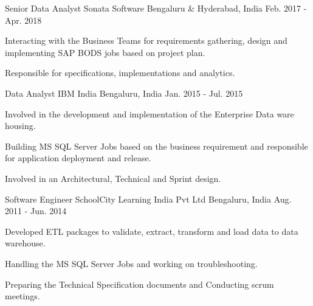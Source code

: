 \begin{cventries}

\cventry
{Senior Data Analyst} %
{Sonata Software} %
{Bengaluru \& Hyderabad, India} %
{Feb. 2017 - Apr. 2018} %
{ %
\begin{cvitems}
\item {Interacting with the Business Teams for requirements gathering, design and implementing SAP BODS jobs based on project plan.}
\item {Responsible for specifications, implementations and analytics.}
\end{cvitems}
}


\cventry
{Data Analyst} %
{IBM India} %
{Bengaluru, India} %
{Jan. 2015 - Jul. 2015} %
{ %
\begin{cvitems}
\item {Involved in the development and implementation of the Enterprise Data ware housing.}
\item {Building MS SQL Server Jobs based on the business requirement and responsible for application deployment and release.}
\item {Involved in an Architectural, Technical and Sprint design.}
\end{cvitems} 
}


\cventry
{Software Engineer} %
{SchoolCity Learning India Pvt Ltd} %
{Bengaluru, India} %
{Aug. 2011 - Jun. 2014} %
{ %
\begin{cvitems}
\item {Developed ETL packages to validate, extract, transform and load data to data warehouse.}
\item {Handling the MS SQL Server Jobs and working on troubleshooting.}
\item {Preparing the Technical Specification documents and Conducting scrum meetings.}
\end{cvitems}
}


\end{cventries}